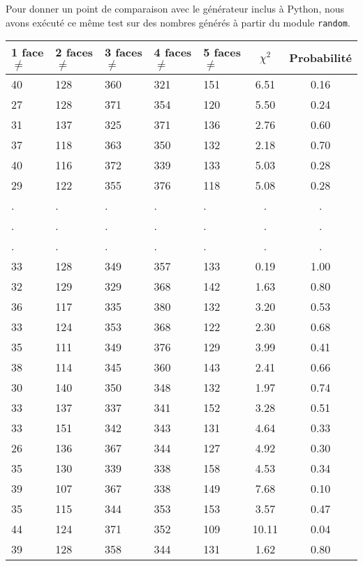 \documentclass[12pt,a4paper]{article}
\begin{document}
\newpage
Pour donner un point de comparaison avec le générateur inclus à Python,
nous avons
exécuté ce même test sur des nombres générés à partir du module \texttt{random}.

\begin{center}
\begin{tabular}{|l|l|l|l|l|c|c|}
\hline
1 face $\neq$ & 2 faces $\neq$  & 3 faces $\neq$ & 4 faces $\neq$ & 5 faces $\neq$ & $\chi^2$ & Probabilité \\
\hline \hline
40 & 128 & 360 & 321 & 151 &  6.51 &  0.16\\ \hline
27 & 128 & 371 & 354 & 120 &  5.50 &  0.24\\ \hline
31 & 137 & 325 & 371 & 136 &  2.76 &  0.60\\ \hline
37 & 118 & 363 & 350 & 132 &  2.18 &  0.70\\ \hline
40 & 116 & 372 & 339 & 133 &  5.03 &  0.28\\ \hline
29 & 122 & 355 & 376 & 118 &  5.08 &  0.28\\ \hline
 . & . & . & . & . & . & . \\ \hline
 . & . & . & . & . & . & . \\ \hline
 . & . & . & . & . & . & . \\ \hline
33 & 128 & 349 & 357 & 133 &  0.19 &  1.00\\ \hline
32 & 129 & 329 & 368 & 142 &  1.63 &  0.80\\ \hline
36 & 117 & 335 & 380 & 132 &  3.20 &  0.53\\ \hline
33 & 124 & 353 & 368 & 122 &  2.30 &  0.68\\ \hline
35 & 111 & 349 & 376 & 129 &  3.99 &  0.41\\ \hline
38 & 114 & 345 & 360 & 143 &  2.41 &  0.66\\ \hline
30 & 140 & 350 & 348 & 132 &  1.97 &  0.74\\ \hline
33 & 137 & 337 & 341 & 152 &  3.28 &  0.51\\ \hline
33 & 151 & 342 & 343 & 131 &  4.64 &  0.33\\ \hline
26 & 136 & 367 & 344 & 127 &  4.92 &  0.30\\ \hline
35 & 130 & 339 & 338 & 158 &  4.53 &  0.34\\ \hline
39 & 107 & 367 & 338 & 149 &  7.68 &  0.10\\ \hline
35 & 115 & 344 & 353 & 153 &  3.57 &  0.47\\ \hline
44 & 124 & 371 & 352 & 109 & 10.11 &  0.04\\ \hline
39 & 128 & 358 & 344 & 131 &  1.62 &  0.80\\ \hline

\end{tabular}
\end{center}
\end{document}
